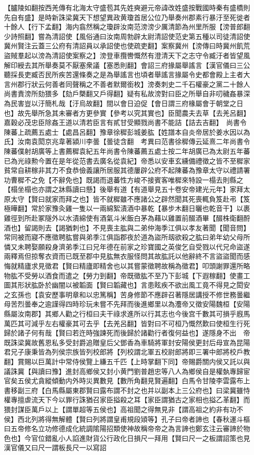 【臚陵如翻按西羌傳有北海太守盛苞其先姓奭避元帝諱改姓盛按戰國時秦有盛橋則先自有盛】是時新誅梁冀天下想望異政黄瓊首居公位乃舉奏州郡素行暴汙至死徙者十餘人【行下孟翻】海内翕然稱之瓊辟汝南范滂滂少厲清節為州里所服【滂普郎翻少詩照翻】嘗為清詔使【風俗通曰汝南周勃辟太尉清詔使范史第五種以司徒清詔使冀州賢注云蓋三公府有清詔員以承詔使也使疏吏翻】案察冀州【滂傳曰時冀州飢荒盜賊羣起以滂為清詔使案察之】滂登車攬轡慨然有澄清天下之志守令臧汙者皆望風解印綬去其所舉奏莫不厭塞衆議【塞悉則翻】會詔三府掾屬舉謠言【漢官儀曰三公聽採長吏臧否民所疾苦還條奏之是為舉謠言也頃者舉謠言掾屬令史都會殿上主者大言州郡行狀云何善者同聲稱之不善者默爾銜枚】滂奏刺史二千石權豪之黨二十餘人尚書責滂所劾猥多【劾戶槩翻又戶得翻】疑有私故滂對曰臣之所舉自非叨穢姦暴深為民害豈以汙簡札哉【汙烏故翻】間以會日迫促【會日謂三府椽屬會于朝堂之日也】故先舉所急其未審者方更參實【參考以究其實也】臣聞農夫去草【去羌呂翻】嘉穀必茂忠臣除姦王道以清若臣言有貳甘受顯戮尚書不能詰【詰去吉翻】　尚書令陳蕃上疏薦五處士【處昌呂翻】豫章徐穉彭城姜肱【姓譜本自炎帝居於姜水因以為氏】汝南袁閎京兆韋著潁川李曇【曇徒含翻　考異曰范書徐穉傳云延熹二年尚書令陳蕃僕射胡廣等上書薦穉袁紀五年尚書令陳蕃薦五處士按二年胡廣已為太尉五年蕃已為光祿勲今置在是年從范書去廣名從袁紀】帝悉以安車玄纁備禮徵之皆不至穉家貧常自耕稼非其力不食恭儉義讓所居服其德屢辟公府不起陳蕃為豫章太守以禮請署功曹穉不之免【不辭免也】既謁而退蕃性方峻不接賓客唯穉來特設一榻去則縣之【榻坐榻也亦謂之牀縣讀曰懸】後舉有道【有道舉見五十卷安帝建光元年】家拜太原太守【賢曰就家而拜之也】皆不就穉雖不應諸公之辟然聞其死喪輒負笈赴弔【笈極曄翻】常於家豫灸雞一隻以一兩綿絮漬酒中暴乾【暴步木翻日曬也乾音干】以裹雞徑到所赴冢隧外以水漬綿使有酒氣斗米飯白茅為藉以雞置前醊酒畢【醊株衛翻酹酒也】留謁則去【謁猶刺也】不見喪主肱與二弟仲海季江俱以孝友著聞【聞音問】常同被而寢不應徵聘肱嘗與弟季江俱詣郡夜於道為盜所刼欲殺之肱曰弟年幼父母所憐又未聘娶願殺身濟弟季江曰兄年德在前家之珍寶國之英俊乞自受戮以代兄命盜遂兩釋焉但掠奪衣資而已既至郡中見肱無衣服怪問其故肱託以他辭終不言盜盜聞而感悔就精廬求見徵君【賢曰精廬即精舍也以其嘗蒙徵聘故稱為徵君】叩頭謝罪還所略物肱不受勞以酒食而遣之【勞力到翻】帝既徵肱不至乃下彭城【下遐稼翻】使畫工圖其形狀肱卧於幽闇以被韜面【賢曰韜藏也】言患眩疾不欲出風工竟不得見之閎安之玄孫也【袁安歷事明章和以忠篤稱】苦身修節不應辟召著隱居講授不修世務曇繼母苦烈曇奉之逾謹得四時珍玩未嘗不先拜而後進鄉里以為灋帝又徵安陽魏桓【安陽縣屬汝南郡】其鄉人勸之行桓曰夫干祿求進所以行其志也今後宫千數其可損乎廐馬萬匹其可減乎左右權豪其可去乎【去羌呂翻】皆對曰不可桓乃慨然歎曰使桓生行死歸於諸子何有哉【賢曰若迕時強諫死而後歸於諸勸行者復何益也】遂隱身不出　帝既誅梁冀故舊恩私多受封爵追贈皇后父鄧香為車騎將軍封安陽侯更封后母宣為昆陽君兄子康秉皆為列侯宗族皆列校郎將【列校謂北軍五校尉郎將即三署中郎將校戶教翻】賞賜以巨萬計中常侍侯覽上縑五千匹【上時掌翻下同】帝賜爵關内侯又託以與議誅冀【與讀曰豫】進封高鄉侯又封小黄門劉普趙忠等八人為鄉侯自是權埶專歸宦官矣五侯尤貪縱傾動内外時災異數見【數所角翻見賢遍翻】白馬令甘陵李雲露布上書移副三府【白馬縣屬東郡賢曰露布謂不封之也并以副本上三公府也】曰梁冀雖恃權專擅虐流天下今以罪行誅猶召家臣搤殺之耳【家臣謂猶古之家相也搤乙革翻】而猥封謀臣萬戶以上【謂單超等五侯也】高祖聞之得無見非【謂高祖之約非有功不侯】西北列將得無解體【賢曰列將謂皇甫規段熲等】孔子曰帝者諦也【春秋運斗樞曰五帝修名立功修德成化統調隂陽招類使神故稱帝帝之為言諦也鄭玄注云審諦於物色也】今官位錯亂小人諂進財貨公行政化日損尺一拜用【賢曰尺一之板謂詔策也見漢官儀又曰尺一謂板長尺一以寫詔